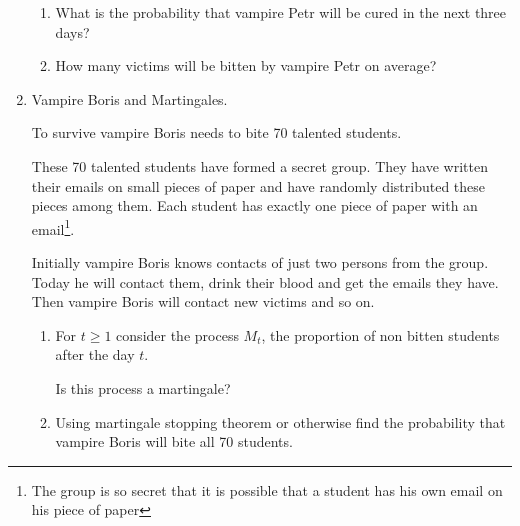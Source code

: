\begin{enumerate}
    \begin{enumerate}
        \item What is the probability that vampire Petr will be cured in the next three days?
        \item How many victims will be bitten by vampire Petr on average?
    \end{enumerate}
 
    \item Vampire Boris and Martingales.
    
    To survive vampire Boris needs to bite 70 talented students. 
    
    These 70 talented students have formed a secret group. They have written their emails on small pieces of paper and have randomly distributed these pieces among them. Each student has exactly one piece of paper with an email\footnote{The group is so secret that it is possible that a student has his own email on his piece of paper}. 
    
    Initially vampire Boris knows contacts of just two persons from the group. Today he will contact them, drink their blood and get the emails they have. Then vampire Boris will contact new victims and so on.
    
    \begin{enumerate}
        \item For $t\geq 1$ consider the process $M_t$, the proportion of non bitten students after the day $t$. 
        
        Is this process a martingale?
        
        \item Using martingale stopping theorem or otherwise find the probability that vampire Boris will bite all 70 students. 
    \end{enumerate}
 
 
\end{enumerate}


